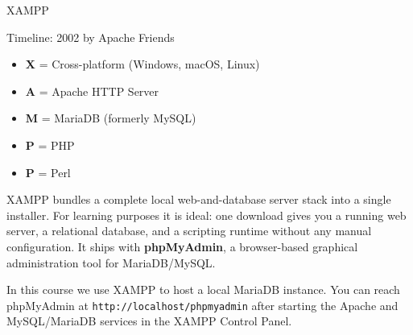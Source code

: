 \begin{frame}{XAMPP}
  \begin{block}{Timeline: 2002 by Apache Friends}
    \begin{itemize}
      \item \textbf{X} = Cross-platform (Windows, macOS, Linux)
      \item \textbf{A} = Apache HTTP Server
      \item \textbf{M} = MariaDB (formerly MySQL)
      \item \textbf{P} = PHP
      \item \textbf{P} = Perl
    \end{itemize}
  \end{block}

  XAMPP bundles a complete local web-and-database server stack into a single
  installer.  For learning purposes it is ideal: one download gives you a
  running web server, a relational database, and a scripting runtime without
  any manual configuration.  It ships with \textbf{phpMyAdmin}, a browser-based
  graphical administration tool for MariaDB/MySQL.

  \begin{examples}{}
    In this course we use XAMPP to host a local MariaDB instance.
    You can reach phpMyAdmin at \texttt{http://localhost/phpmyadmin} after
    starting the Apache and MySQL/MariaDB services in the XAMPP Control Panel.
  \end{examples}
\end{frame}

